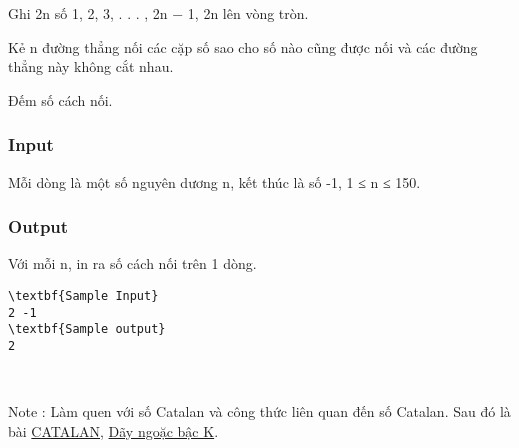 

Ghi 2n số 1, 2, 3, . . . , 2n − 1, 2n lên vòng tròn.

Kẻ n đường thẳng nối các cặp số sao cho số nào cũng được nối và các đường thẳng này không cắt nhau.

Đếm số cách nối.

\subsubsection{Input}

Mỗi dòng là một số nguyên dương n, kết thúc là số -1, 1 ≤ n ≤ 150. 

\subsubsection{Output}

Với mỗi n, in ra số cách nối trên 1 dòng.
\begin{verbatim}
\textbf{Sample Input}
2 -1
\textbf{Sample output}
2\end{verbatim}

 

Note : Làm quen với số Catalan và công thức liên quan đến số Catalan. Sau đó là bài \href{http://vnoi.info/problems/show/CATALAN/}{CATALAN}, \href{http://vnoi.info/problems/show/BRACKET/}{Dãy ngoặc bậc K}.
